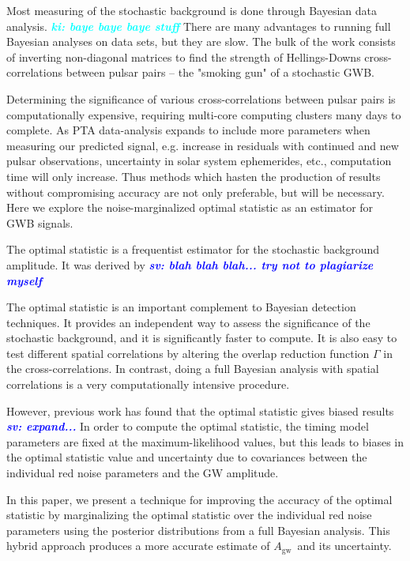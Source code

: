 \documentclass[twocolumn,aps,prd,superscriptaddress]{revtex4-1}
\newcommand{\sv}[1]{\textcolor{blue}{\it{\textbf{sv: #1}}} }
\newcommand{\ki}[1]{\textcolor{cyan}{\it{\textbf{ki: #1}}} }
\newcommand{\Agw}{\ensuremath{A_\mathrm{gw}}}
\begin{document}
Most measuring of the stochastic background is done through Bayesian data analysis. \ki{baye baye baye stuff} There are many advantages to running full Bayesian analyses on data sets, but they are slow. The bulk of the work consists of inverting non-diagonal matrices to find the strength of Hellings-Downs cross-correlations between pulsar pairs -- the "smoking gun" of a stochastic GWB.    

Determining the significance of various cross-correlations between pulsar pairs is computationally expensive, requiring multi-core computing clusters many days to complete. As PTA data-analysis expands to include more parameters when measuring our predicted signal, e.g. increase in residuals with continued and new pulsar observations, uncertainty in solar system ephemerides, etc., computation time will only increase. Thus methods which hasten the production of results without compromising accuracy are not only preferable, but will be necessary. Here we explore the noise-marginalized optimal statistic as an estimator for GWB signals.

The optimal statistic is a frequentist estimator for the stochastic background amplitude. 
It was derived by \citet{abc+2009} \sv{blah blah blah... try not to plagiarize myself}

The optimal statistic is an important complement to Bayesian detection techniques. 
It provides an independent way to assess the significance of the stochastic background, 
and it is significantly faster to compute. It is also easy to test different spatial correlations 
by altering the overlap reduction function $\Gamma$ in the cross-correlations. 
In contrast, doing a full Bayesian analysis with spatial correlations is a very computationally 
intensive procedure.

However, previous work has found that the optimal statistic gives biased results \sv{expand...} 
In order to compute the optimal statistic, the timing model parameters are fixed 
at the maximum-likelihood values, but this leads to biases in the 
optimal statistic value and uncertainty due to covariances between the 
individual red noise parameters and the GW amplitude. 

In this paper, we present a technique for improving the accuracy of the optimal statistic 
by marginalizing the optimal statistic over the individual red noise parameters 
using the posterior distributions from a full Bayesian analysis. 
This hybrid approach produces a more accurate 
estimate of \Agw\ and its uncertainty.
\end{document}
